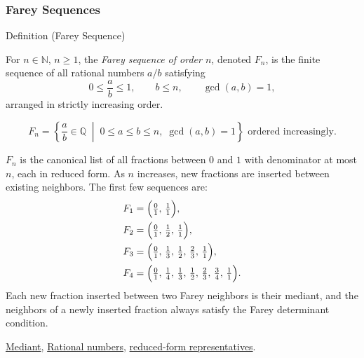 \subsubsection*{Farey Sequences}

\begin{definitionbox}{Definition (Farey Sequence)}
\begin{definition}
\label{def:farey-sequence}
For $n \in \mathbb{N}$, $n \geq 1$, the \emph{Farey sequence of order $n$},
denoted $F_n$, is the finite sequence of all rational numbers $a/b$ satisfying
\[
0 \leq \frac{a}{b} \leq 1, \qquad b \leq n, \qquad \gcd(a,b) = 1,
\]
arranged in strictly increasing order.
\end{definition}
\end{definitionbox}

\begin{remark*}
\[
F_n = \left\{ \frac{a}{b} \in \mathbb{Q} \;\middle|\;
0 \leq a \leq b \leq n,\; \gcd(a,b)=1 \right\}
\text{ ordered increasingly.}
\]
\end{remark*}

\begin{remark*}[Interpretation]
$F_n$ is the canonical list of all fractions between $0$ and $1$ with
denominator at most $n$, each in reduced form.  As $n$ increases, new
fractions are inserted between existing neighbors.  The first few sequences are:
\begin{align*}
F_1 &= \Bigl(\tfrac{0}{1},\, \tfrac{1}{1}\Bigr), \\
F_2 &= \Bigl(\tfrac{0}{1},\, \tfrac{1}{2},\, \tfrac{1}{1}\Bigr), \\
F_3 &= \Bigl(\tfrac{0}{1},\, \tfrac{1}{3},\, \tfrac{1}{2},\,
              \tfrac{2}{3},\, \tfrac{1}{1}\Bigr), \\
F_4 &= \Bigl(\tfrac{0}{1},\, \tfrac{1}{4},\, \tfrac{1}{3},\,
              \tfrac{1}{2},\, \tfrac{2}{3},\, \tfrac{3}{4},\,
              \tfrac{1}{1}\Bigr).
\end{align*}
Each new fraction inserted between two Farey neighbors is their mediant,
and the neighbors of a newly inserted fraction always satisfy the Farey
determinant condition.
\end{remark*}

\begin{remark*}[Dependencies]
\hyperref[def:mediant]{Mediant},
\hyperref[def:rational-numbers]{Rational numbers},
\hyperref[thm:fraction-pair-equivalence]{reduced-form representatives}.
\end{remark*}


